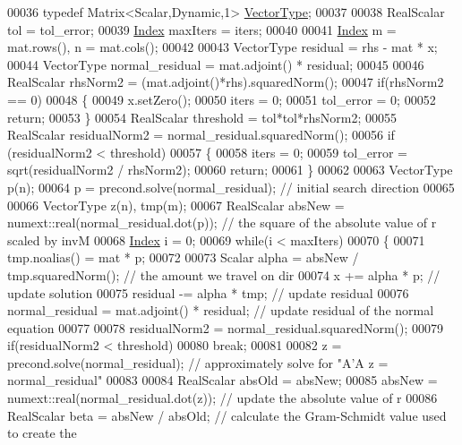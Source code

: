 \begin{DoxyCode}
00036   \textcolor{keyword}{typedef} Matrix<Scalar,Dynamic,1> \hyperlink{struct_vector_type}{VectorType};
00037   
00038   RealScalar tol = tol\_error;
00039   \hyperlink{namespace_eigen_a62e77e0933482dafde8fe197d9a2cfde}{Index} maxIters = iters;
00040   
00041   \hyperlink{namespace_eigen_a62e77e0933482dafde8fe197d9a2cfde}{Index} m = mat.rows(), n = mat.cols();
00042 
00043   VectorType residual        = rhs - mat * x;
00044   VectorType normal\_residual = mat.adjoint() * residual;
00045 
00046   RealScalar rhsNorm2 = (mat.adjoint()*rhs).squaredNorm();
00047   \textcolor{keywordflow}{if}(rhsNorm2 == 0) 
00048   \{
00049     x.setZero();
00050     iters = 0;
00051     tol\_error = 0;
00052     \textcolor{keywordflow}{return};
00053   \}
00054   RealScalar threshold = tol*tol*rhsNorm2;
00055   RealScalar residualNorm2 = normal\_residual.squaredNorm();
00056   \textcolor{keywordflow}{if} (residualNorm2 < threshold)
00057   \{
00058     iters = 0;
00059     tol\_error = sqrt(residualNorm2 / rhsNorm2);
00060     \textcolor{keywordflow}{return};
00061   \}
00062   
00063   VectorType p(n);
00064   p = precond.solve(normal\_residual);                         \textcolor{comment}{// initial search direction}
00065 
00066   VectorType z(n), tmp(m);
00067   RealScalar absNew = numext::real(normal\_residual.dot(p));  \textcolor{comment}{// the square of the absolute value of r
       scaled by invM}
00068   \hyperlink{namespace_eigen_a62e77e0933482dafde8fe197d9a2cfde}{Index} i = 0;
00069   \textcolor{keywordflow}{while}(i < maxIters)
00070   \{
00071     tmp.noalias() = mat * p;
00072 
00073     Scalar alpha = absNew / tmp.squaredNorm();      \textcolor{comment}{// the amount we travel on dir}
00074     x += alpha * p;                                 \textcolor{comment}{// update solution}
00075     residual -= alpha * tmp;                        \textcolor{comment}{// update residual}
00076     normal\_residual = mat.adjoint() * residual;     \textcolor{comment}{// update residual of the normal equation}
00077     
00078     residualNorm2 = normal\_residual.squaredNorm();
00079     \textcolor{keywordflow}{if}(residualNorm2 < threshold)
00080       \textcolor{keywordflow}{break};
00081     
00082     z = precond.solve(normal\_residual);             \textcolor{comment}{// approximately solve for "A'A z = normal\_residual"}
00083 
00084     RealScalar absOld = absNew;
00085     absNew = numext::real(normal\_residual.dot(z));  \textcolor{comment}{// update the absolute value of r}
00086     RealScalar beta = absNew / absOld;              \textcolor{comment}{// calculate the Gram-Schmidt value used to create the
}
\end{DoxyCode}
